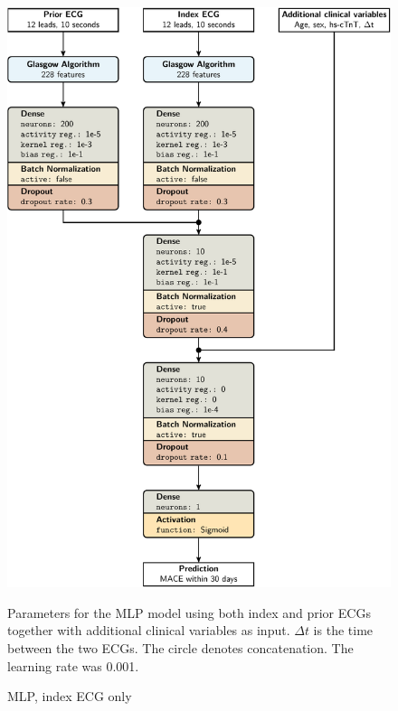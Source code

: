 \documentclass[preprint]{elsarticle}
\begin{document}
\begin{figure}[H]
\centering
\includegraphics[scale=\modelscale,keepaspectratio]{figures/model-mlp4.pdf}
\caption{MLP, index ECG only}
\medskip
\small
Parameters for the MLP model using both index and prior ECGs together with additional clinical variables as input. $\Delta t$ is the time between the two ECGs. The circle denotes concatenation. The learning rate was 0.001.
\end{figure}
\end{document}
